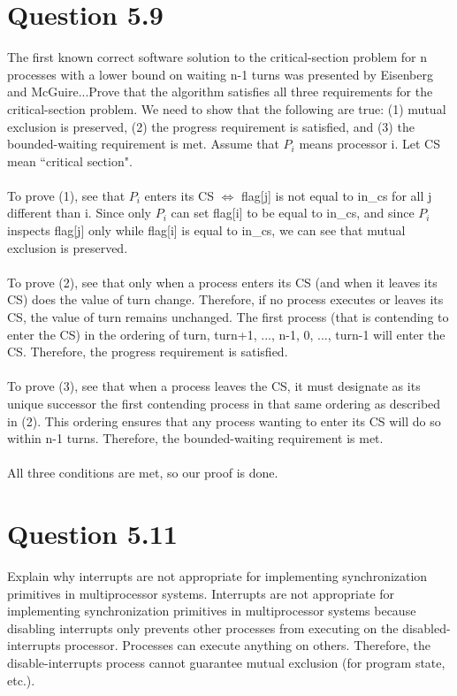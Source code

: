 \documentclass[12pt]{article}
\begin{document}
\section*{Question 5.9} {\color{blue}The first known correct software solution to the critical-section problem for n processes with a lower bound on waiting n-1 turns was presented by Eisenberg and McGuire...Prove that the algorithm satisfies all three requirements for the critical-section problem.}
We need to show that the following are true: (1) mutual exclusion is preserved, (2) the progress requirement is satisfied, and (3) the bounded-waiting requirement is met. Assume that $P_{i}$ means processor i. Let CS mean ``critical section".
\\ \\
To prove (1), see that $P_{i}$ enters its CS $\iff$ flag[j] is not equal to in\_cs for all j different than i. Since only $P_{i}$ can set flag[i] to be equal to in\_cs, and since $P_{i}$ inspects flag[j] only while flag[i] is equal to in\_cs, we can see that mutual exclusion is preserved.
\\ \\
To prove (2), see that only when a process enters its CS (and when it leaves its CS) does the value of turn change. Therefore, if no process executes or leaves its CS, the value of turn remains unchanged. The first process (that is contending to enter the CS) in the ordering of turn, turn+1, ..., n-1, 0, ..., turn-1 will enter the CS. Therefore, the progress requirement is satisfied.
\\ \\
To prove (3), see that when a process leaves the CS, it must designate as its unique successor the first contending process in that same ordering as described in (2). This ordering ensures that any process wanting to enter its CS will do so within n-1 turns. Therefore, the bounded-waiting requirement is met.
\\ \\
All three conditions are met, so our proof is done.

\section*{Question 5.11} {\color{blue}Explain why interrupts are not appropriate for implementing synchronization primitives in multiprocessor systems.} 
Interrupts are not appropriate for implementing synchronization primitives in multiprocessor systems because disabling interrupts only prevents other processes from executing on the disabled-interrupts processor. Processes can execute anything on others. Therefore, the disable-interrupts process cannot guarantee mutual exclusion (for program state, etc.).
\end{document}
